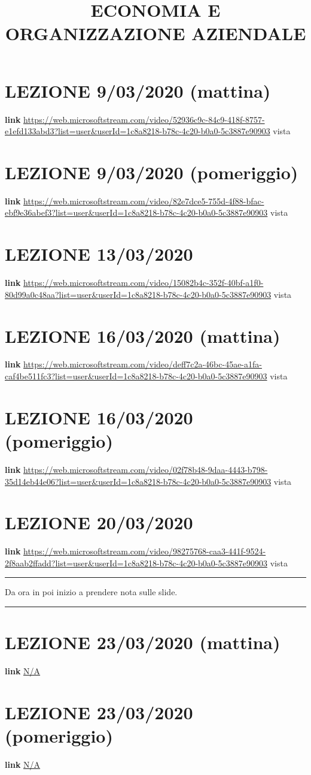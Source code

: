 \documentclass[a4paper, 9pt]{article}
\title{ECONOMIA E ORGANIZZAZIONE AZIENDALE}
\begin{document}
\maketitle
\section{LEZIONE 9/03/2020 (mattina)}
\textbf{link} \url{https://web.microsoftstream.com/video/52936c9c-84c9-418f-8757-e1efd133abd3?list=user&userId=1c8a8218-b78c-4c20-b0a0-5c3887e90903} vista
\section{LEZIONE 9/03/2020 (pomeriggio)}
\textbf{link} \url{https://web.microsoftstream.com/video/82e7dce5-755d-4f88-bfac-ebf9e36abef3?list=user&userId=1c8a8218-b78c-4c20-b0a0-5c3887e90903} vista
\section{LEZIONE 13/03/2020}
\textbf{link} \url{https://web.microsoftstream.com/video/15082b4c-352f-40bf-a1f0-80d99a0c48aa?list=user&userId=1c8a8218-b78c-4c20-b0a0-5c3887e90903} vista
\section{LEZIONE 16/03/2020 (mattina)}
\textbf{link} \url{https://web.microsoftstream.com/video/deff7c2a-46bc-45ae-a1fa-caf4be511fc3?list=user&userId=1c8a8218-b78c-4c20-b0a0-5c3887e90903} vista
\section{LEZIONE 16/03/2020 (pomeriggio)}
\textbf{link} \url{https://web.microsoftstream.com/video/02f78b48-9daa-4443-b798-35d14eb44e06?list=user&userId=1c8a8218-b78c-4c20-b0a0-5c3887e90903} vista
\section{LEZIONE 20/03/2020}
\textbf{link} \url{https://web.microsoftstream.com/video/98275768-caa3-441f-9524-2f8aab2ffadd?list=user&userId=1c8a8218-b78c-4c20-b0a0-5c3887e90903} vista
\newline
\rule{\textwidth}{0,4pt}
Da ora in poi inizio a prendere nota sulle slide.\newline
\rule{\textwidth}{0,4pt}
\section{LEZIONE 23/03/2020 (mattina)}
\textbf{link} \url{N/A} 
\section{LEZIONE 23/03/2020 (pomeriggio)}
\textbf{link} \url{N/A} 
\end{document}
